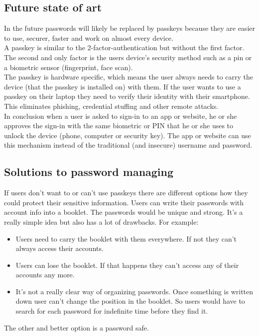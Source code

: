 \documentclass[conference]{IEEEtran}
\begin{document}
\subsection{Future state of art}
In the future passwords will likely be replaced by passkeys because they are easier to use, securer, faster and work on almost every device.\\
A passkey is similar to the 2-factor-authentication but without the first factor. The second and only factor is the users device's security method such as a pin or a biometric sensor (fingerprint, face scan). \\
The passkey is hardware specific, which means the user always needs to carry the device (that the passkey is installed on) with them. If the user wants to use a passkey on their laptop they need to verify their identity with their smartphone. This eliminates phishing, credential stuffing and other remote attacks. \\
In conclusion when a user is asked to sign-in to an app or website, he or she approves the sign-in with the same biometric or PIN that he or she uses to unlock the device (phone, computer or security key). The app or website can use this mechanism instead of the traditional (and insecure) username and password. \cite{b5}

\subsection{Solutions to password managing}
If users don't want to or can't use passkeys there are different options how they could protect their sensitive information. Users can write their passwords with account info into a booklet. The passwords would be unique and strong. It's a really simple idea but also has a lot of drawbacks. 
For example:
\begin{itemize}
\item Users need to carry the booklet with them everywhere. If not they can't always access their accounts.
\item Users can lose the booklet. If that happens they can't access any of their accounts any more.
\item It's not a really clear way of organizing passwords. Once something is written down user can't change the position in the booklet. So users would have to search for each password for indefinite time before they find it.
\end{itemize}
The other and better option is a password safe.  
\end{document}
